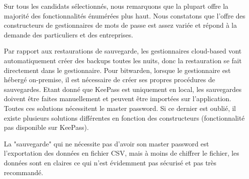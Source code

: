 Sur tous les candidats sélectionnés, nous remarquons que la plupart offre la majorité des fonctionnalités énumérées plus haut. Nous constatons que l'offre des constructeurs de gestionnaires de mots de passe est assez variée et répond à la demande des particuliers et des entreprises.

Par rapport aux restaurations de sauvegarde, les gestionnaires cloud-based vont automatiquement créer des backups toutes les nuits, donc la restauration se fait directement dans le gestionnaire. Pour bitwarden, lorsque le gestionnaire est hébergé on-premise, il est nécessaire de créer ses propres procédures de sauvegardes. Etant donné que KeePass est uniquement en local, les sauvegardes doivent être faites manuellement et peuvent être importées sur l'application. Toutes ces solutions nécessitent le master password. Si ce dernier est oublié, il existe plusieurs solutions différentes en fonction des constructeurs (fonctionnalité pas disponible sur KeePass). 

La "sauvegarde" qui ne nécessite pas d'avoir son master password est l'exportation des données en fichier CSV, mais à moins de chiffrer le fichier, les données sont en claires ce qui n'est évidemment pas sécurisé et pas très recommandé.
